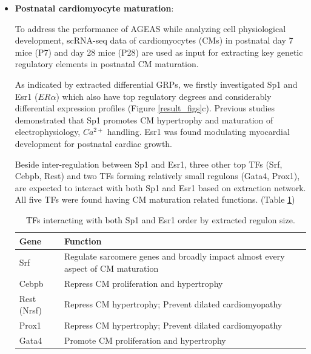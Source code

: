 \documentclass[fleqn,10pt]{wlscirep}
\begin{document}
\begin{itemize}


      \item {\textbf{Postnatal cardiomyocyte maturation}}:

        To address the performance of AGEAS while analyzing cell physiological development, scRNA-seq data of cardiomyocytes (CMs) in postnatal day 7 mice (P7) and day 28 mice (P28) are used as input for extracting key genetic regulatory elements in postnatal CM maturation.

        As indicated by extracted differential GRPs, we firstly investigated Sp1 and Esr1 ($ER\alpha$) which also have top regulatory degrees and considerably differential expression profiles (Figure \ref{result_figs}c).
        Previous studies demonstrated that Sp1 promotes CM hypertrophy \cite{sp1_hypertrophy} and maturation of electrophysiology, $Ca^{2+}$ handling. \cite{Sp1_electrophysiologt, CM_mature}
        Esr1 was found modulating myocardial development for postnatal cardiac growth.\cite{esr1_cm, esr1_cm_growth}

        Beside inter-regulation between Sp1 and Esr1, three other top TFs (Srf, Cebpb, Rest) and two TFs forming relatively small regulons (Gata4, Prox1), are expected to interact with both Sp1 and Esr1 based on extraction network.
        All five TFs were found having CM maturation related functions. (Table \ref{interact_TFs})

        \begin{table}[ht]
            \centering
            \begin{tabular}{|l|l|}
              \hline
              \textbf{Gene} & \textbf{Function}  \\
              \hline
              Srf & Regulate sarcomere genes and broadly impact almost every aspect of CM maturation\cite{CM_mature} \\
              \hline
              Cebpb & Repress CM proliferation and hypertrophy\cite{cebpb_1, cebpb_2}\\
              \hline
              Rest (Nrsf) & Repress CM hypertrophy; Prevent dilated cardiomyopathy\cite{rest_1}\\
              \hline
              Prox1 & Repress CM hypertrophy; Prevent dilated cardiomyopathy\cite{prox1_CM} \\
              \hline
              Gata4 & Promote CM proliferation and hypertrophy\cite{CM_posnatal_mature} \\
              \hline
            \end{tabular}
            \caption{
              \label{interact_TFs}
              TFs interacting with both Sp1 and Esr1 order by extracted regulon size.
            }
        \end{table}


\end{itemize}
\end{document}
